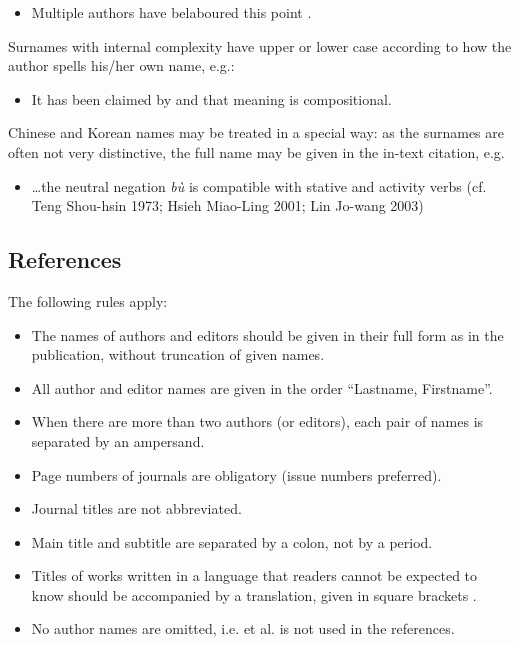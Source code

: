 \documentclass[charis,linguex]{glossa}
\begin{document}
\begin{itemize}
\item Multiple authors have belaboured this point \citep{chomsky:1981,chomsky:1986a,chomsky:1986,iverson:1989,casali:1998a,blevins:2004,franks:2005}.
\end{itemize}
Surnames with internal complexity have upper or lower case according to how the author spells his/her own name, e.g.:

\begin{itemize}
\item It has been claimed by \citet{swart:1998} and \citet{belder:2011} that meaning is compositional. 
\end{itemize}
Chinese and Korean names may be treated in a special way: as the surnames are often not very distinctive, the full name may be given in the in-text citation, e.g.

\begin{itemize}
\item  \ldots the neutral negation \textit{bù} is compatible with stative and activity verbs (cf. Teng Shou-hsin 1973; Hsieh Miao-Ling 2001; Lin Jo-wang 2003) %
\end{itemize}

\subsection{References}\label{sec:refs}

The following rules apply:

\begin{itemize}
\item The names of authors and editors should be given in their full form as in the publication, without truncation of given names.
\item All author and editor names are given in the order ``Lastname, Firstname''.
\item When there are more than two authors (or editors), each pair of names is separated by an ampersand.
\item Page numbers of journals are obligatory (issue numbers preferred).
\item Journal titles are not abbreviated.
\item Main title and subtitle are separated by a colon, not by a period.
\item Titles of works written in a language that readers cannot be expected to know should be accompanied by a translation, given in square brackets \citep{Li1999}.
\item No author names are omitted, i.e. et al. is not used in the references.
\end{itemize}
\end{document}
